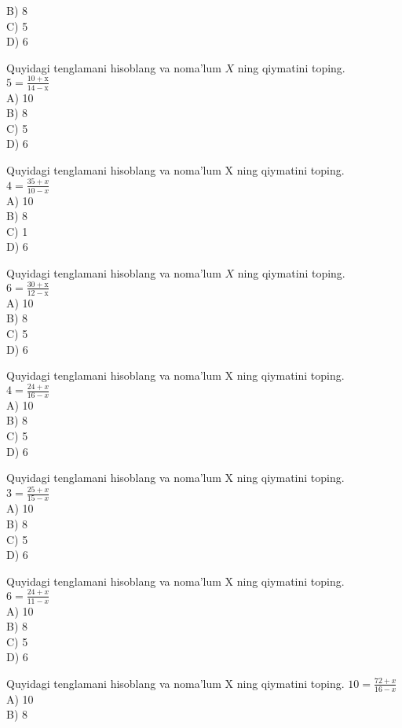 B) 8\\
C) 5\\
D) 6
  \item Quyidagi tenglamani hisoblang va noma'lum $X$ ning qiymatini toping.\\
$5=\frac{10+\mathrm{x}}{14-\mathrm{x}}$\\
A) 10\\
B) 8\\
C) 5\\
D) 6
  \item Quyidagi tenglamani hisoblang va noma'lum X ning qiymatini toping.\\
$4=\frac{35+x}{10-x}$\\
A) 10\\
B) 8\\
C) 1\\
D) 6
  \item Quyidagi tenglamani hisoblang va noma'lum $X$ ning qiymatini toping.\\
$6=\frac{30+\mathrm{x}}{12-\mathrm{x}}$\\
A) 10\\
B) 8\\
C) 5\\
D) 6
  \item Quyidagi tenglamani hisoblang va noma'lum X ning qiymatini toping.\\
$4=\frac{24+x}{16-x}$\\
A) 10\\
B) 8\\
C) 5\\
D) 6
  \item Quyidagi tenglamani hisoblang va noma'lum X ning qiymatini toping.\\
$3=\frac{25+x}{15-x}$\\
A) 10\\
B) 8\\
C) 5\\
D) 6
  \item Quyidagi tenglamani hisoblang va noma'lum X ning qiymatini toping.\\
$6=\frac{24+x}{11-x}$\\
A) 10\\
B) 8\\
C) 5\\
D) 6
  \item Quyidagi tenglamani hisoblang va noma'lum X ning qiymatini toping. $10=\frac{72+x}{16-x}$\\
A) 10\\
B) 8\\
